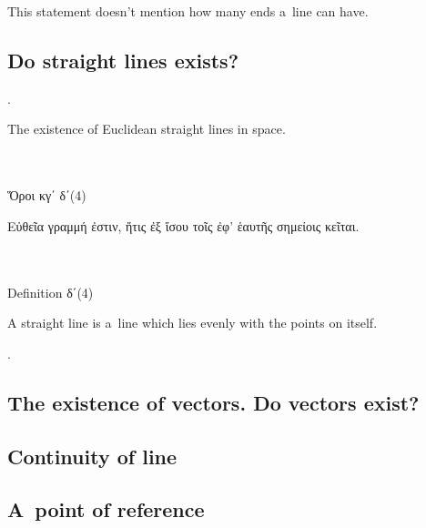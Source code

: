 This statement doesn’t mention how many ends a~line can have.

\subsection{Do straight lines exists?}

.

\noindent
The existence of
Euclidean straight lines
in space.

{\small
\setlength{\parindent}{0pt}

\nopagebreak%
\begin{multicols}{2}
%
\\
\\[.3em]
\textgreek{Ὅροι κγ΄} \textgreek{δ΄}\:(4)

\textgreek{Εὐθεῖα γραμμή ἐστιν, ἥτις ἐξ ἴσου τοῖς ἐφ' ἑαυτῆς σημείοις κεῖται.}

\columnbreak
%
\\
\\[.3em]
Definition \textgreek{δ΄}\:(4)

A straight line is a~line which lies evenly with the points on itself.
%
\end{multicols}
\par}

.

\subsection{The existence of vectors. Do vectors exist?}

\subsection{Continuity of line}

\subsection{A~point of reference}

